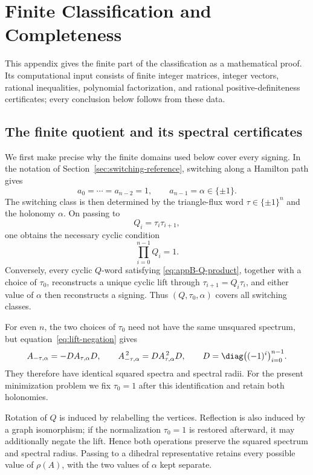 \section{Finite Classification and Completeness}
\label{app:finite-classification}

This appendix gives the finite part of the classification as a mathematical
proof. Its computational input consists of finite integer matrices,
integer vectors, rational inequalities, polynomial factorization, and
rational positive-definiteness certificates; every conclusion below follows
from these data.

\subsection{The finite quotient and its spectral certificates}
\label{app:finite-quotient}

We first make precise why the finite domains used below cover every signing.
In the notation of Section~\ref{sec:switching-reference}, switching along a
Hamilton path gives
\[
 a_0=\cdots=a_{n-2}=1,
 \qquad a_{n-1}=\alpha\in\{\pm1\}.
\]
The switching class is then determined by the triangle-flux word
\(\tau\in\{\pm1\}^n\) and the holonomy \(\alpha\).  On passing to
\[
 Q_i=\tau_i\tau_{i+1},
\]
one obtains the necessary cyclic condition
\begin{equation}\label{eq:appB-Q-product}
 \prod_{i=0}^{n-1}Q_i=1.
\end{equation}
Conversely, every cyclic \(Q\)-word satisfying
\eqref{eq:appB-Q-product}, together with a choice of \(\tau_0\), reconstructs
a unique cyclic lift through \(\tau_{i+1}=Q_i\tau_i\), and either value of
\(\alpha\) then reconstructs a signing.  Thus \((Q,\tau_0,\alpha)\) covers
all switching classes.

For even \(n\), the two choices of \(\tau_0\) need not have the same
unsquared spectrum, but equation~\eqref{eq:lift-negation} gives
\[
 A_{-\tau,\alpha}=-DA_{\tau,\alpha}D,
 \qquad
 A_{-\tau,\alpha}^{\,2}=DA_{\tau,\alpha}^{\,2}D,
 \qquad D=\diag\bigl((-1)^i\bigr)_{i=0}^{n-1}.
\]
They therefore have identical squared spectra and spectral radii. For the
present minimization problem we fix \(\tau_0=1\) after this identification
and retain both holonomies.

Rotation of \(Q\) is induced by relabelling the vertices.  Reflection is
also induced by a graph isomorphism; if the normalization \(\tau_0=1\) is
restored afterward, it may additionally negate the lift.  Hence both
operations preserve the squared spectrum and spectral radius. Passing to a
dihedral representative retains every possible value of \(\rho(A)\), with
the two values of \(\alpha\) kept separate.

